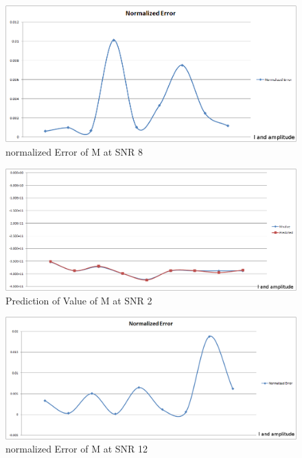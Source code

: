 \begin{figure}
\begin{center}
\includegraphics[scale=0.5]{images/chapter_5/inverse/error_snr_8.png}
\caption{normalized Error of M at SNR 8}
\end{center}
\end{figure}


\begin{figure}
\begin{center}
\includegraphics[scale=0.5]{images/chapter_5/inverse/pred_snr_12.png}
\caption{Prediction of Value of M at SNR 2}
\end{center}
\end{figure}


\begin{figure}
\begin{center}
\includegraphics[scale=0.5]{images/chapter_5/inverse/error_snr_12.png}
\caption{normalized Error of M at SNR 12}
\end{center}
\end{figure}

